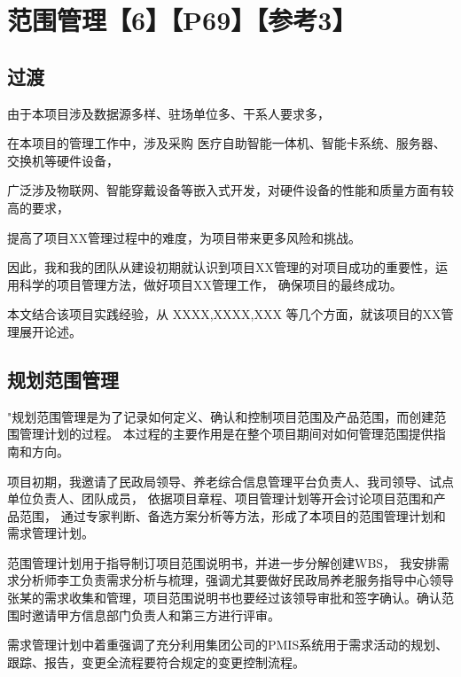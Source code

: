 \documentclass[UTF8]{../computerUniverse}
\begin{document}
\chapter{范围管理【6】【P69】【参考3】}


\section{过渡}

由于本项目涉及数据源多样、驻场单位多、干系人要求多，

在本项目的管理工作中，涉及采购
医疗自助智能一体机、智能卡系统、服务器、交换机等硬件设备，

广泛涉及物联网、智能穿戴设备等嵌入式开发，对硬件设备的性能和质量方面有较高的要求，

提高了项目XX管理过程中的难度，为项目带来更多风险和挑战。

因此，我和我的团队从建设初期就认识到项目XX管理的对项目成功的重要性，运用科学的项目管理方法，做好项目XX管理工作，
确保项目的最终成功。

本文结合该项目实践经验，从
XXXX,XXXX,XXX
等几个方面，就该项目的XX管理展开论述。




\section{规划范围管理}
"规划范围管理是为了记录如何定义、确认和控制项目范围及产品范围，而创建范围管理计划的过程。
本过程的主要作用是在整个项目期间对如何管理范围提供指南和方向。


项目初期，我邀请了民政局领导、养老综合信息管理平台负责人、我司领导、试点单位负责人、团队成员，
依据项目章程、项目管理计划等开会讨论项目范围和产品范围，
通过专家判断、备选方案分析等方法，形成了本项目的范围管理计划和需求管理计划。

范围管理计划用于指导制订项目范围说明书，并进一步分解创建WBS，
我安排需求分析师李工负责需求分析与梳理，强调尤其要做好民政局养老服务指导中心领导张某的需求收集和管理，项目范围说明书也要经过该领导审批和签字确认。确认范围时邀请甲方信息部门负责人和第三方进行评审。

需求管理计划中着重强调了充分利用集团公司的PMIS系统用于需求活动的规划、跟踪、报告，变更全流程要符合规定的变更控制流程。


\end{document}

